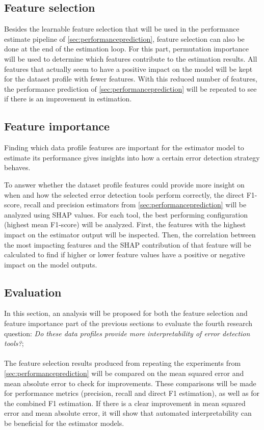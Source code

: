 \subsection{Feature selection}
\label{subsec:featureselection}
Besides the learnable feature selection that will be used in the performance estimate pipeline of \autoref{sec:performanceprediction}, feature selection can also be done at the end of the estimation loop. For this part, permutation importance will be used to determine which features contribute to the estimation results. All features that actually seem to have a positive impact on the model will be kept for the dataset profile with fewer features. With this reduced number of features, the performance prediction of \autoref{sec:performanceprediction} will be repeated to see if there is an improvement in estimation.

\subsection{Feature importance}
Finding which data profile features are important for the estimator model to estimate its performance gives insights into how a certain error detection strategy behaves.

To answer whether the dataset profile features could provide more insight on when and how the selected error detection tools perform correctly, the direct F1-score, recall and precision estimators from \autoref{sec:performanceprediction} will be analyzed using SHAP values. For each tool, the best performing configuration (highest mean F1-score) will be analyzed. First, the features with the highest impact on the estimator output will be inspected. Then, the correlation between the most impacting features and the SHAP contribution of that feature will be calculated to find if higher or lower feature values have a positive or negative impact on the model outputs. 

\subsection{Evaluation}
In this section, an analysis will be proposed for both the feature selection and feature importance part of the previous sections to evaluate the fourth research question: \textit{Do these data profiles provide more interpretability of error detection tools?};
~\\~\\The feature selection results produced from repeating the experiments from \autoref{sec:performanceprediction} will be compared on the mean squared error and mean absolute error to check for improvements. These comparisons will be made for performance metrics (precision, recall and direct F1 estimation), as well as for the combined F1 estimation.
If there is a clear improvement in mean squared error and mean absolute error, it will show that automated interpretability can be beneficial for the estimator models.

